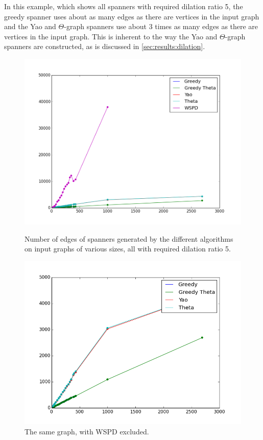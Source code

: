 \documentclass[a4paper,twoside,11pt,hidelinks]{article}
\theoremstyle{plain}
\theoremstyle{definition}  %
\begin{document}
In this example, which shows all spanners with required dilation ratio 5, the greedy spanner uses about as many edges as there are vertices in the input graph and the Yao and $\Theta$-graph spanners use about 3 times as many edges as there are vertices in the input graph. This is inherent to the way the Yao and $\Theta$-graph spanners are constructed, as is discussed in  \autoref{sec:results:dilation}.

\begin{figure}[h]
	\begin{minipage}[t]{0.48\textwidth}
      \centering
      \includegraphics[width=\textwidth]{figures/Number_of_vertices_vs_number_of_edges.png}
      \caption{Number of edges of spanners generated by the different algorithms on input graphs of various sizes, all with required dilation ratio 5.}
      \label{fig:nredges}
    \end{minipage}
    \hfill
    \begin{minipage}[t]{0.48\textwidth}
      \centering
      \includegraphics[width=\textwidth]{figures/Number_of_vertices_vs_number_of_edges_no_WSPD.png}
      \caption{The same graph, with WSPD excluded.}
      \label{fig:nredges-no-wspd}
    \end{minipage}
\end{figure}
\end{document}
